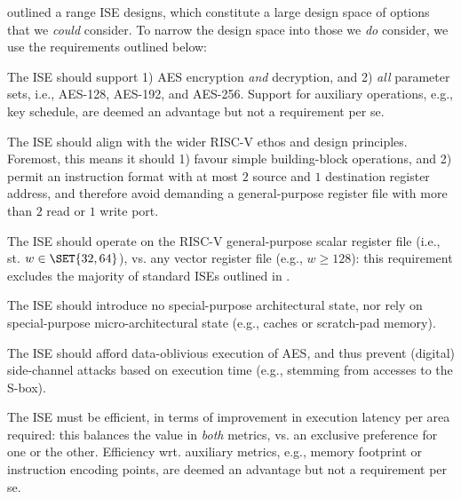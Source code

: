 
outlined a range ISE designs, which constitute a large design space of
options that we {\em could} consider.  To narrow the design space into
those we {\em do} consider, we use the requirements outlined below:

\begin{requirement}\label{req:1}
The ISE should support
1) AES encryption {\em and} decryption,
   and
2) {\em all} parameter sets, i.e., AES-128, AES-192, and AES-256.
Support for 
auxiliary operations, e.g., key schedule, 
are deemed an advantage but not a requirement per se.
\end{requirement}

\begin{requirement}\label{req:2}
The ISE should align with the wider RISC-V ethos and design principles.
Foremost, this means it should 
1) favour simple building-block operations,
   and
2) permit an instruction format with at most $2$ source and $1$ destination register address,
   and therefore avoid demanding a general-purpose register file with more than $2$ read or
   $1$ write port.
\end{requirement}

\begin{requirement}\label{req:3}
The ISE should operate on 
the RISC-V general-purpose scalar register file 
(i.e., st. $w \in \SET{ 32, 64 }$),
vs. 
any                        vector register file
(e.g., $w \ge 128$):
this requirement excludes the majority of standard ISEs outlined in 
.
\end{requirement}

\begin{requirement}\label{req:4}
The ISE should introduce no
special-purpose       architectural state, 
nor rely on
special-purpose micro-architectural state
(e.g., caches or scratch-pad memory).
\end{requirement}

\begin{requirement}\label{req:5}
The ISE should afford data-oblivious execution of AES, and thus prevent 
(digital) side-channel attacks based on execution time 
(e.g., stemming from accesses to the S-box).
\end{requirement}

\begin{requirement}
The ISE must be efficient, in terms of improvement in execution latency 
per area required: this balances the value in {\em both} metrics, vs. an 
exclusive preference for one or the other.
Efficiency wrt. 
auxiliary metrics, e.g., memory footprint or instruction encoding points,
are deemed an advantage but not a requirement per se.
\end{requirement}

